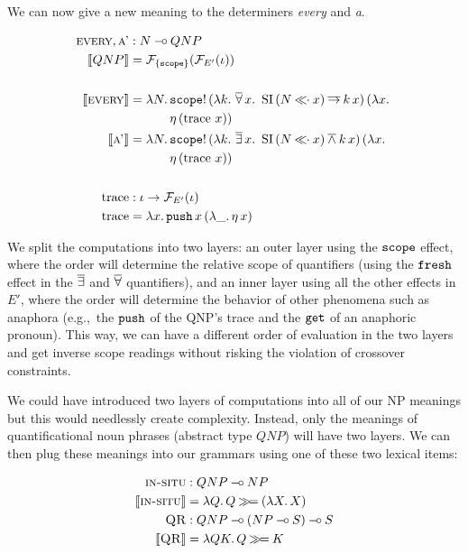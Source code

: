 We can now give a new meaning to the determiners \emph{every} and \emph{a}.

\begin{align*}
  \textsc{every}, \textsc{a'} &: N \mathbin{{-}\mkern-3.5mu{\circ}} QNP \\
  \llbracket QNP \rrbracket &= \mathcal{F}_{\{\mathtt{scope}\}}(\mathcal{F}_{E'}(\iota)) \\
  \\
  \llbracket \textsc{every} \rrbracket &= \lambda N.\, \begin{aligned}[t]
      &\mathtt{scope}!\,(\lambda k.\, \mathop{\overline{\forall}} x.\ \operatorname{SI}\,(N \mathbin{\ll\!\!\cdot} x) \mathbin{\overline{\to}} k\,x)\,(\lambda x.\,  \\
      &\eta\,(\operatorname{trace}\,x))
    \end{aligned} \\
  \llbracket \textsc{a'} \rrbracket &= \lambda N.\, \begin{aligned}[t]
      &\mathtt{scope}!\,(\lambda k.\, \mathop{\overline{\exists}} x.\ \operatorname{SI}\,(N \mathbin{\ll\!\!\cdot} x) \mathbin{\overline{\land}} k\,x)\,(\lambda x.\,  \\
      &\eta\,(\operatorname{trace}\,x))
    \end{aligned} \\
  \\
  \operatorname{trace} &: \iota \to \mathcal{F}_{E'}(\iota) \\
  \operatorname{trace} &= \lambda x.\, \mathtt{push}\,x\,(\lambda \_.\, \eta\,x)
\end{align*}

We split the computations into two layers: an outer layer using the
$\mathtt{scope}$ effect, where the order will determine the relative scope of
quantifiers (using the $\mathtt{fresh}$ effect in the $\mathop{\overline{\exists}}$ and $\mathop{\overline{\forall}}$
quantifiers), and an inner layer using all the other effects in $E'$, where
the order will determine the behavior of other phenomena such as anaphora
(e.g.,\ the $\mathtt{push}$ of the QNP's trace and the $\mathtt{get}$ of an
anaphoric pronoun). This way, we can have a different order of evaluation
in the two layers and get inverse scope readings without risking the
violation of crossover constraints.

We could have introduced two layers of computations into all of our NP
meanings but this would needlessly create complexity. Instead, only the
meanings of quantificational noun phrases (abstract type $QNP$) will have
two layers. We can then plug these meanings into our grammars using one of
these two lexical items:

\begin{align*}
  \textsc{in-situ} &: QNP \mathbin{{-}\mkern-3.5mu{\circ}} NP \\
  \llbracket \textsc{in-situ} \rrbracket &= \lambda Q.\, Q \mathbin{\gg\!=} (\lambda X.\, X) \\
  \textsc{QR} &: QNP \mathbin{{-}\mkern-3.5mu{\circ}} (NP \mathbin{{-}\mkern-3.5mu{\circ}} S) \mathbin{{-}\mkern-3.5mu{\circ}} S \\
  \llbracket \textsc{QR} \rrbracket &= \lambda Q K.\, Q \mathbin{\gg\!=} K
\end{align*}


